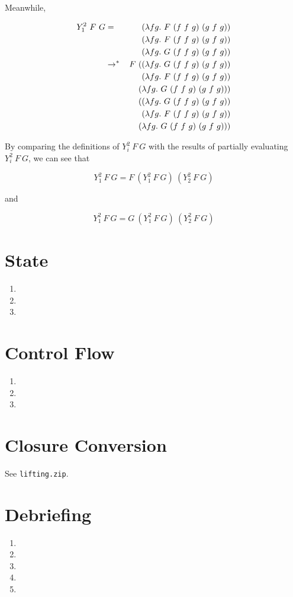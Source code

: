 \documentclass[10pt]{article}
\newcommand{\stepsTo}{\rightarrow}
\newcommand{\multiStepsTo}{\stepsTo^*}
\begin{document}
Meanwhile,

\begin{eqnarray*}
    Y^2_1~F~G & =             & (\lambda f g .~F~(f~f~g)~(g~f~g)) \\
              &               & (\lambda f g .~F~(f~f~g)~(g~f~g)) \\
              &               & (\lambda f g .~G~(f~f~g)~(g~f~g)) \\
              & \multiStepsTo & F~((\lambda f g .~G~(f~f~g)~(g~f~g)) \\
              &               & \hspace{.45cm}(\lambda f g .~F~(f~f~g)~(g~f~g)) \\
              &               & \hspace{.45cm}(\lambda f g .~G~(f~f~g)~(g~f~g))) \\
              &               & \hspace{.35cm}((\lambda f g .~G~(f~f~g)~(g~f~g)) \\
              &               & \hspace{.45cm}(\lambda f g .~F~(f~f~g)~(g~f~g)) \\
              &               & \hspace{.45cm}(\lambda f g .~G~(f~f~g)~(g~f~g)))
\end{eqnarray*}

By comparing the definitions of $Y^2_i~F~G$ with the results of partially
evaluating $Y^2_i~F~G$, we can see that

$$Y^2_1~F~G = F~(Y^2_1~F~G)~(Y^2_2~F~G) $$

and

$$Y^2_1~F~G = G~(Y^2_1~F~G)~(Y^2_2~F~G) $$

\section{State}%
\begin{enumerate}
    \item
    \item
    \item
\end{enumerate}
\section{Control Flow}%
\begin{enumerate}
    \item
    \item
    \item
\end{enumerate}
\section{Closure Conversion}%
See \texttt{lifting.zip}.
\section{Debriefing}%
\begin{enumerate}
    \item
    \item
    \item
    \item
    \item
\end{enumerate}
\end{document}
